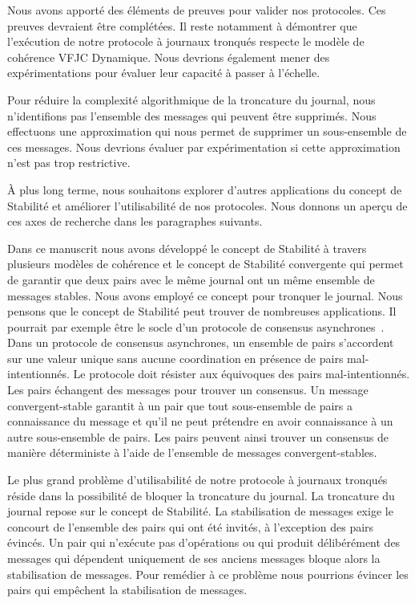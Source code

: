 Nous avons apporté des éléments de preuves pour valider nos protocoles.
Ces preuves devraient être complétées.
Il reste notamment à démontrer que l'exécution de notre protocole à journaux tronqués respecte le modèle de cohérence \acl{VFJC} Dynamique.
Nous devrions également mener des expérimentations pour évaluer leur capacité à passer à l'échelle.

Pour réduire la complexité algorithmique de la troncature du journal, nous n'identifions pas l'ensemble des messages qui peuvent être supprimés.
Nous effectuons une approximation qui nous permet de supprimer un sous-ensemble de ces messages.
Nous devrions évaluer par expérimentation si cette approximation n'est pas trop restrictive.

À plus long terme, nous souhaitons explorer d'autres applications du concept de Stabilité et améliorer l'utilisabilité de nos protocoles.
Nous donnons un aperçu de ces axes de recherche dans les paragraphes suivants.

Dans ce manuscrit nous avons développé le concept de Stabilité à travers plusieurs modèles de cohérence et le concept de Stabilité convergente qui permet de garantir que deux pairs avec le même journal ont un même ensemble de messages stables.
Nous avons employé ce concept pour tronquer le journal.
Nous pensons que le concept de Stabilité peut trouver de nombreuses applications.
Il pourrait par exemple être le socle d'un protocole de consensus asynchrones~\autocite{bracha1985asynchronous}.
Dans un protocole de consensus asynchrones, un ensemble de pairs s'accordent sur une valeur unique sans aucune coordination en présence de pairs mal-intentionnés.
Le protocole doit résister aux équivoques des pairs mal-intentionnés.
Les pairs échangent des messages pour trouver un consensus.
Un message convergent-stable garantit à un pair que tout sous-ensemble de pairs a connaissance du message et qu'il ne peut prétendre en avoir connaissance à un autre sous-ensemble de pairs.
Les pairs peuvent ainsi trouver un consensus de manière déterministe à l'aide de l'ensemble de messages convergent-stables.

Le plus grand problème d'utilisabilité de notre protocole à journaux tronqués réside dans la possibilité de bloquer la troncature du journal.
La troncature du journal repose sur le concept de Stabilité.
La stabilisation de messages exige le concourt de l'ensemble des pairs qui ont été invités, à l'exception des pairs évincés.
Un pair qui n'exécute pas d'opérations ou qui produit délibérément des messages qui dépendent uniquement de ses anciens messages bloque alors la stabilisation de messages.
Pour remédier à ce problème nous pourrions évincer les pairs qui empêchent la stabilisation de messages.

